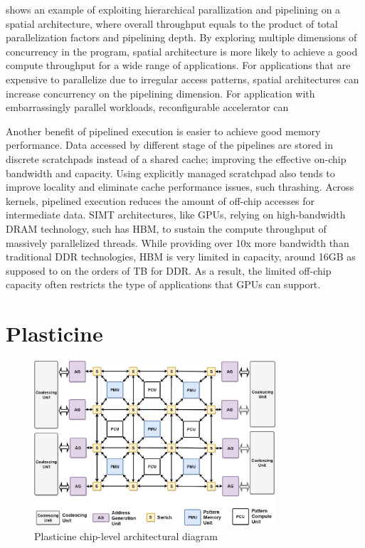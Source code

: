  shows an example of exploiting hierarchical parallization and pipelining on
a spatial architecture, where overall throughput equals to the product of total parallelization factors 
and pipelining depth.
By exploring multiple dimensions of concurrency in the program, spatial architecture is more likely
to achieve a good compute throughput for a wide range of applications.
For applications that are expensive to parallelize due to irregular access patterns, spatial
architectures can increase concurrency on the pipelining dimension.  For application with
embarrassingly parallel workloads, reconfigurable accelerator can 

Another benefit of pipelined execution is easier to achieve good memory performance.
Data accessed by different stage of the pipelines are stored in discrete scratchpads 
instead of a shared cache; improving the effective on-chip bandwidth and capacity.
Using explicitly managed scratchpad also tends to improve locality and 
eliminate cache performance issues, such thrashing.
Across kernels, pipelined execution reduces the amount of off-chip accesses for intermediate
data.
SIMT architectures, like GPUs, relying on high-bandwidth DRAM technology, such has HBM, to sustain
the compute throughput of massively parallelized threads.
While providing over 10x more bandwidth than traditional DDR technologies, HBM is very limited in
capacity, around 16GB as supposed to on the orders of TB for DDR.
As a result, the limited off-chip capacity often restricts the type of applications that
GPUs can support.


\section{Plasticine}

\begin{figure}
\centering
\includegraphics[width=0.8\textwidth]{figs/plasticine.pdf}
\caption[Plasticine chip-level architecture]{Plasticine chip-level architectural diagram}
\label{fig:plasticine}
\end{figure}

